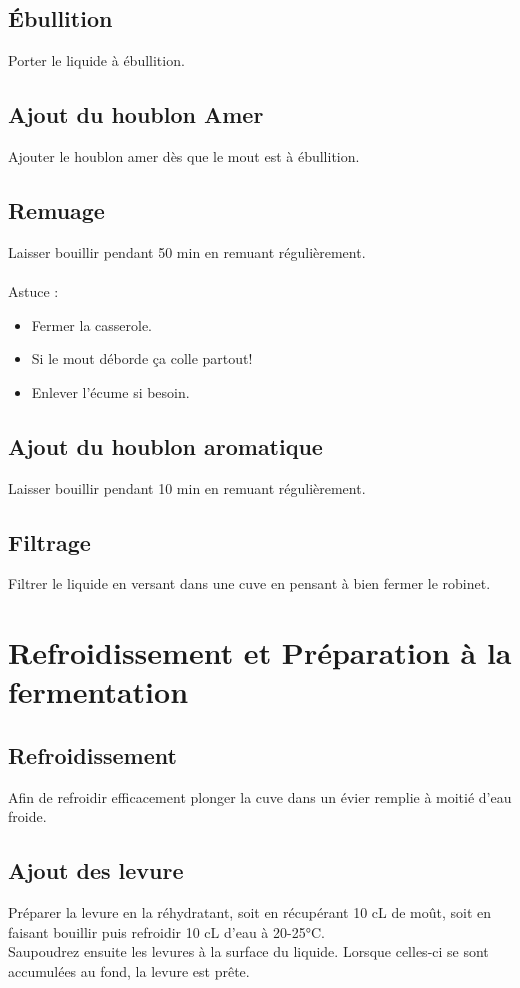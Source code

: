 \documentclass[twoside,twocolumn]{report}
\begin{document}
		\subsection{Ébullition}
		Porter le liquide à ébullition.
		\subsection{Ajout du houblon Amer }
		Ajouter le houblon amer dès que le mout est à ébullition.
		\subsection{Remuage}
		Laisser bouillir pendant 50 min en  remuant régulièrement.\\ \\
		
		Astuce : 
		\begin{itemize}
			\item Fermer la casserole.\\
			\item Si le mout déborde ça colle partout!\\
			\item Enlever l'écume si besoin.
		\end{itemize}
		\subsection{Ajout du houblon aromatique}
		Laisser bouillir pendant 10 min en  remuant régulièrement.
		\subsection{Filtrage}
		Filtrer le liquide en versant dans une cuve en pensant à bien fermer le robinet.\\
		
		\section{Refroidissement et Préparation à la fermentation}
		\subsection{Refroidissement}
		Afin de refroidir efficacement plonger la cuve dans un évier remplie à moitié d'eau froide.
		\subsection{Ajout des levure}
		Préparer la levure en la réhydratant, soit en récupérant 10 cL de moût, soit en faisant bouillir puis refroidir 10 cL d’eau à 20-25°C.\\
		Saupoudrez ensuite les levures à la surface	du liquide. Lorsque celles-ci se sont accumulées au fond, la levure est prête.\\ \\
		
\end{document}
